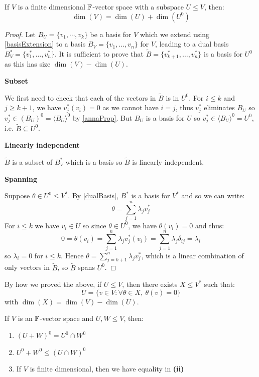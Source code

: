 \documentclass[../main.tex]{subfiles}
\begin{document}
\begin{proposition}
  If $V$ is a finite dimensional $\mathbb{F}$-vector space with a subspace $U \leq V$, then: \label{annaDim}
  \[
    \dim(V) = \dim(U) + \dim(U^{0})
  \]
\end{proposition}
\begin{proof}
  Let $B_U = \{v_1, \cdots, v_k\}$ be a basis for $V$ which we extend using \cref{basisExtension} to a basis $B_V = \{v_1, \ldots, v_n\}$ for $V$, leading to a dual basis $B^{*}_V = \{v^{*}_1, \ldots, v^{*}_n\}$.
  It is sufficient to prove that $\widetilde{B} = \{v_{k + 1}^{*}, \ldots, v^{*}_n\}$  is a basis for $U^{0}$ as this has size $\dim(V) - \dim(U)$.

  \textbf{Subset}\par
  We first need to check that each of the vectors in $\widetilde{B}$ is in $U^{0}$.
  For $i \leq k$ and $j \geq k + 1$, we have $v^{*}_j(v_i) = 0$ as we cannot have $i = j$, thus $v^{*}_j$ eliminates $B_U$ so $v^{*}_j \in (B_{U})^{0} = \langle B_U \rangle^{0}$ by \cref{annaProp}.
  But $B_U$ is a basis for $U$ so $v^{*}_j \in \langle B_U \rangle^{0} = U^{0}$, i.e. $\widetilde{B} \subseteq U^{0}$.

  \textbf{Linearly independent}\par
  $\widetilde{B}$ is a subset of $B^{*}_V$ which is a basis so $\widetilde{B}$ is linearly independent.

  \textbf{Spanning}\par
  Suppose $\theta \in U^{0} \leq V^{*}$.
  By \cref{dualBasis}, $B^{*}$ is a basis for $V^{*}$ and so we can write:
  \[
    \theta = \sum_{j = 1}^{n} \lambda_j v^{*}_j
  \]
  For $i \leq k$ we have $v_i \in U$ so since $\theta \in U^{0}$, we have $\theta(v_i) = 0$ and thus:
  \[
    0 = \theta(v_i) = \sum_{j = 1}^{n} \lambda_j v^{*}_j(v_i) = \sum_{j = 1}^{n} \lambda_j \delta_{i j} = \lambda_i
  \]
  so $\lambda_i = 0$ for $i \leq k$.
  Hence $\theta = \sum_{j = k + 1}^{n} \lambda_j v^{*}_j$, which is a linear combination of only vectors in $\widetilde{B}$, so $\widetilde{B}$ spans $U^{0}$.
\end{proof}
\begin{remark}
  By how we proved the above, if $U \leq V$, then there exists $X \leq V^{*}$ such that:
  \[
    U = \{v \in V: \forall \theta \in X,\ \theta(v) = 0\}
  \]
  with $\dim(X) = \dim(V) - \dim(U)$.
\end{remark}
\begin{proposition}
  If $V$ is an $\mathbb{F}$-vector space and $U, W \leq V$, then:
  \begin{enumerate}
    \item $(U + W)^{0} = U^{0} \cap W^{0}$
    \item $U^{0} + W^{0} \leq (U \cap W)^{0}$
    \item If $V$ is finite dimensional, then we have equality in \textbf{(ii)}
  \end{enumerate}
\end{proposition}
\end{document}
